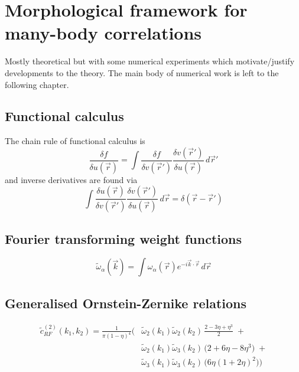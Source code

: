 \documentclass[12pt]{report}
\begin{document}
\chapter{Morphological framework for many-body correlations}
Mostly theoretical but with some numerical experiments which motivate/justify developments to the theory.
The main body of numerical work is left to the following chapter.

\section{Functional calculus}

The chain rule of functional calculus is
\begin{equation*}
  \frac{\delta f}{\delta u(\vec{r})} =
  \int
  \frac{\delta f}{\delta v(\vec{r}')}
  \frac{\delta v(\vec{r}')}{\delta u(\vec{r})}
  \, d\vec{r}'
\end{equation*}
and inverse derivatives are found via
\begin{equation*}
  \int
  \frac{\delta u(\vec{r})}{\delta v(\vec{r}')}
  \frac{\delta v(\vec{r}')}{\delta u(\vec{r})}
  \, d\vec{r} =
  \delta(\vec{r} - \vec{r}')
\end{equation*}

\section{Fourier transforming weight functions}

\begin{equation}
  \widetilde{\omega}_\alpha(\vec{k}) =
  \int \omega_\alpha (\vec{r}) e^{-i \vec{k}\cdot\vec{r}} \, d\vec{r}
\end{equation}

\section{Generalised Ornstein-Zernike relations}

\begin{equation}
  \begin{split}
    \tilde{c}^{(2)}_{RF}(k_1,k_2) =
    \frac{1}{\pi (1-\eta)^4}
    \Bigg(
    &
    \widetilde{\omega }_2 (k_1)
    \widetilde{\omega }_2 (k_2)
    \,
    \frac{2 - 3\eta + \eta^3}{2}
    \; + \\
    &
    \widetilde{\omega }_2 (k_1)
    \widetilde{\omega}_3 (k_2)
    \,
    \big(2 + 6\eta -8 \eta ^3\big)
    \; + \\
    &
    \widetilde{\omega }_3 (k_1)
    \widetilde{\omega }_3 (k_2)
    \,
    \big(6 \eta  (1 + 2 \eta)^2\big)
    \Bigg)
  \end{split}
\end{equation}
\end{document}
